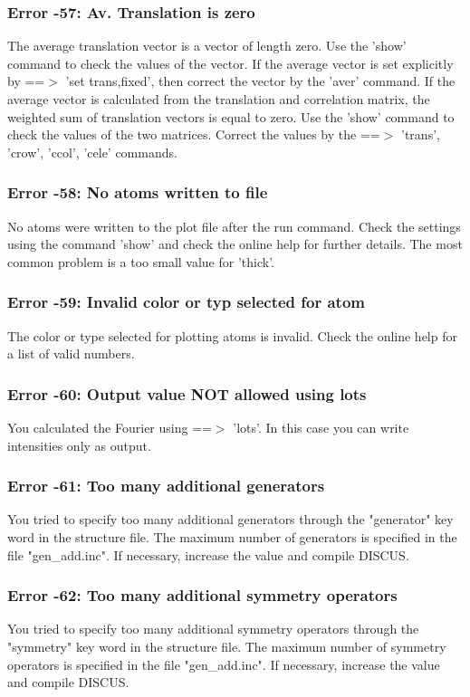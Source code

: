 \subsubsection{Error -57: Av. Translation is zero}
\par
The average translation vector is a vector of length zero. 
Use the 'show' command to check the values of the vector. 
If the average vector is set explicitly by ==$> $ 'set trans,fixed', then 
correct the vector by the 'aver' command. 
If the average vector is calculated from the translation and correlation 
matrix, the weighted sum of translation vectors is equal to zero. 
Use the 'show' command to check the values of the two matrices. 
Correct the values by the ==$> $ 'trans', 'crow', 'ccol', 'cele' commands. 
\subsubsection{Error -58: No atoms written to file}
\par
No atoms were written to the plot file after the run command. Check 
the settings using the command 'show' and check the online help for 
further details. The most common problem is a too small value for 
'thick'. 
\subsubsection{Error -59: Invalid color or typ selected for atom}
\par
The color or type selected for plotting atoms is invalid. Check the 
online help for a list of valid numbers. 
\subsubsection{Error -60: Output value NOT allowed using lots}
\par
You calculated the Fourier using ==$> $ 'lots'. In this case you can write 
intensities only as output. 
\subsubsection{Error -61: Too many additional generators}
\par
You tried to specify too many additional generators through the 
"generator" key word in the structure file. The maximum number of 
generators is specified in the file "gen\_add.inc". If necessary, increase 
the value and compile DISCUS. 
\subsubsection{Error -62: Too many additional symmetry operators}
\par
You tried to specify too many additional symmetry operators through the 
"symmetry"  key word in the structure file. The maximum number of 
symmetry operators is specified in the file "gen\_add.inc". If necessary, 
increase the value and compile DISCUS. 
